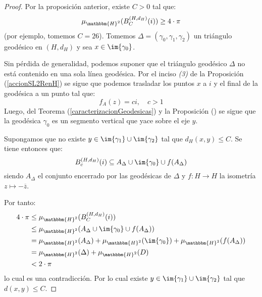 \documentclass[12pt]{report}
\theoremstyle{largebreak}
\newcommand\cf[3]{\ensuremath{#1:#2\rightarrow#3}}
\newcommand{\bbm}[1]{\ensuremath{\mathbbm{#1}}}
\begin{document}
    \begin{proof}
        Por la proposición anterior, existe $C>0$ tal que:
        \begin{equation*}
            \mu_{\bbm{H}^2}(B_C^{(H,d_H)}(i))\geq 4\cdot\pi
        \end{equation*}
        (por ejemplo, tomemos $C=26$). Tomemos $\Delta=(\gamma_0,\gamma_1,\gamma_2)$ un triángulo geodésico en $(H,d_H)$ y sea $x\in\im{\gamma_0}$.

        Sin pérdida de generalidad, podemos suponer que el triángulo geodésico $\Delta$ no está contenido en una sola línea geodésica. Por el inciso \textit{(3)} de la Proposición (\ref{accionSL2RenH}) se sigue que podemos trasladar los puntos $x$ a $i$ y el final de la geodésica a un punto tal que:
        \begin{equation*}
            f_A(z)=ci, \quad c>1
        \end{equation*}
        Luego, del Teorema (\ref{caracterizacionGeodesicas}) y la Proposición () se sigue que la geodésica $\gamma_0$ es un segmento vertical que yace sobre el eje $y$.

        Supongamos que no existe $y\in\im{\gamma_1}\cup\im{\gamma_2}$ tal que $d_H(x,y)\leq C$. Se tiene entonces que:
        \begin{equation*}
            B_c^{(H,d_H)}(i)\subseteq A_\Delta\cup\im{\gamma_0}\cup f(A_\Delta)
        \end{equation*}
        siendo $A_\Delta$ el conjunto encerrado por las geodésicas de $\Delta$ y $\cf{f}{H}{H}$ la isometría $z\mapsto-\overline{z}$.


        Por tanto:
        \begin{equation*}
            \begin{split}
                4\cdot\pi&\leq\mu_{\bbm{H}^2}(B_C^{(H,d_H)}(i))\\
                &\leq\mu_{\bbm{H}^2}(A_\Delta\cup\im{\gamma_0}\cup f(A_\Delta))\\
                &=\mu_{\bbm{H}^2}(A_\Delta)+\mu_{\bbm{H}^2}(\im{\gamma_0})+\mu_{\bbm{H}^2}(f(A_\Delta))\\
                &=\mu_{\bbm{H}^2}(\Delta)+\mu_{\bbm{H}^2}(D)\\
                &< 2\cdot\pi\\
            \end{split}
        \end{equation*}
        lo cual es una contradicción. Por lo cual existe $y\in\im{\gamma_1}\cup\im{\gamma_2}$ tal que $d(x,y)\leq C$.


\end{proof}
\end{document}
